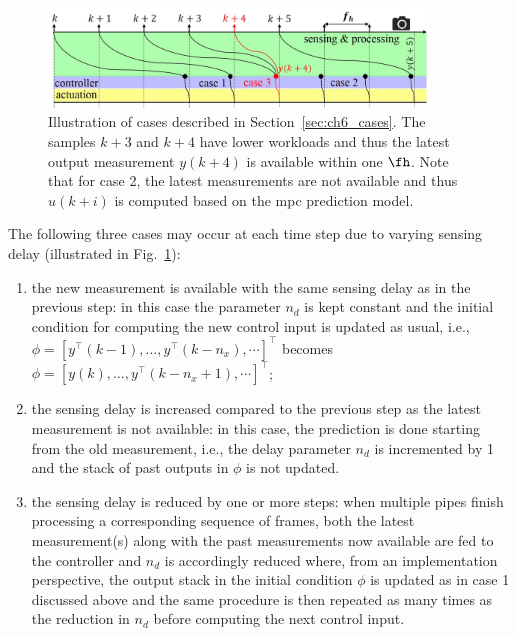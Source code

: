 \begin{figure}[t]
\centerline{
    \includegraphics[width=0.9\textwidth]{images/pIBCv.jpg}
    }
    \caption{Illustration of cases described in Section~\ref{sec:ch6_cases}.
    The samples $k+3$ and $k+4$ have lower workloads and thus the latest output measurement $y(k+4)$ is available within one $\fh$. Note that for case 2, the latest measurements are not available and thus $u(k+i)$ is computed based on the \gls{mpc} prediction model.}
    \label{fig:ch6_pIBCvariations}
    \vspace{-2em}
\end{figure}
The following three cases may occur at each time step due to varying sensing delay (illustrated in Fig.~\ref{fig:ch6_pIBCvariations}): 
\begin{enumerate}
\item 
the new measurement is available with the same sensing delay as in the previous step: in this case the parameter $n_d$ is kept constant and the initial condition for computing the new control input is updated as usual, i.e., $\phi=[y^{\top}(k-1),\ldots,y^{\top}(k-n_x),\cdots]^{\top}$ becomes $\phi=[y(k),\ldots,y^{\top}(k-n_x+1),\cdots]^{\top}$; 
\item the sensing delay is increased compared to the previous step as the latest measurement is not available: in this case, the prediction is done starting from the old measurement, i.e., the delay parameter $n_d$ is incremented by 1 and the stack of past outputs in $\phi$ is not updated. 
\item the sensing delay is reduced by one or more steps: when multiple pipes finish processing a corresponding sequence of frames, both the latest measurement(s) along with the past measurements now available are fed to the controller and $n_d$ is accordingly reduced where, from an implementation perspective, the output stack in the initial condition $\phi$ is updated as in case 1 discussed above and the same procedure is then repeated as many times as the reduction in $n_d$ before computing the next control input.
\end{enumerate} 

